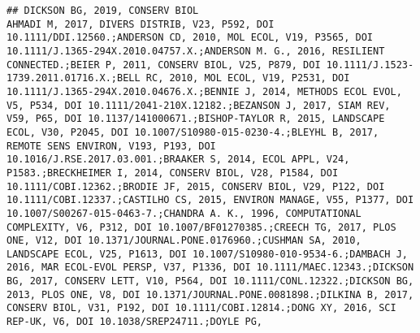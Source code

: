 \documentclass[]{article}
\begin{document}
\begin{verbatim}
## DICKSON BG, 2019, CONSERV BIOL                                                                                                                                                                                                                                                                                                                                                                                                                                                                                                                                                                                                                                                                                                                                                                                                                                                                                                                                                                                                                                                                                                                                                                                                                                                                                                                                                                                                                                                                                                                                                                                                                                                                                                                                                                                                                                                                                                    AHMADI M, 2017, DIVERS DISTRIB, V23, P592, DOI 10.1111/DDI.12560.;ANDERSON CD, 2010, MOL ECOL, V19, P3565, DOI 10.1111/J.1365-294X.2010.04757.X.;ANDERSON M. G., 2016, RESILIENT CONNECTED.;BEIER P, 2011, CONSERV BIOL, V25, P879, DOI 10.1111/J.1523-1739.2011.01716.X.;BELL RC, 2010, MOL ECOL, V19, P2531, DOI 10.1111/J.1365-294X.2010.04676.X.;BENNIE J, 2014, METHODS ECOL EVOL, V5, P534, DOI 10.1111/2041-210X.12182.;BEZANSON J, 2017, SIAM REV, V59, P65, DOI 10.1137/141000671.;BISHOP-TAYLOR R, 2015, LANDSCAPE ECOL, V30, P2045, DOI 10.1007/S10980-015-0230-4.;BLEYHL B, 2017, REMOTE SENS ENVIRON, V193, P193, DOI 10.1016/J.RSE.2017.03.001.;BRAAKER S, 2014, ECOL APPL, V24, P1583.;BRECKHEIMER I, 2014, CONSERV BIOL, V28, P1584, DOI 10.1111/COBI.12362.;BRODIE JF, 2015, CONSERV BIOL, V29, P122, DOI 10.1111/COBI.12337.;CASTILHO CS, 2015, ENVIRON MANAGE, V55, P1377, DOI 10.1007/S00267-015-0463-7.;CHANDRA A. K., 1996, COMPUTATIONAL COMPLEXITY, V6, P312, DOI 10.1007/BF01270385.;CREECH TG, 2017, PLOS ONE, V12, DOI 10.1371/JOURNAL.PONE.0176960.;CUSHMAN SA, 2010, LANDSCAPE ECOL, V25, P1613, DOI 10.1007/S10980-010-9534-6.;DAMBACH J, 2016, MAR ECOL-EVOL PERSP, V37, P1336, DOI 10.1111/MAEC.12343.;DICKSON BG, 2017, CONSERV LETT, V10, P564, DOI 10.1111/CONL.12322.;DICKSON BG, 2013, PLOS ONE, V8, DOI 10.1371/JOURNAL.PONE.0081898.;DILKINA B, 2017, CONSERV BIOL, V31, P192, DOI 10.1111/COBI.12814.;DONG XY, 2016, SCI REP-UK, V6, DOI 10.1038/SREP24711.;DOYLE PG, 
\end{verbatim}
\end{document}
